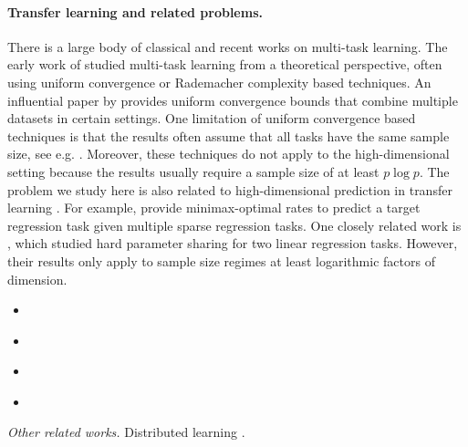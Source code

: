 \paragraph{Transfer learning and related problems.}
There is a large body of classical and recent works on multi-task learning.
The early work of \cite{B00,BS03,M06} studied multi-task learning from a theoretical perspective, often using uniform convergence or Rademacher complexity based techniques.
An influential paper by \cite{BBCK10} provides uniform convergence bounds that combine multiple datasets in certain settings.
One limitation of uniform convergence based techniques is that the results often assume that all  tasks have the same sample size, see e.g. \cite{B00,MPR16}.
\citet{pontil2013excess}
Moreover, these techniques do not apply to the high-dimensional setting because the results usually require a sample size of at least $p \log p$.
The problem we study here is also related to high-dimensional prediction in transfer learning \cite{li2020transfer,bastani2020predicting}.
For example, \cite{li2020transfer} provide minimax-optimal rates to predict a target regression task given multiple sparse regression tasks.
One closely related work is \cite{WZR20}, which studied hard parameter sharing for two linear regression tasks.
However, their results only apply to sample size regimes at least logarithmic factors of dimension.
\begin{itemize}
	\item \citet{lei2021nearoptimal}
	\item \citet{kalan2020minimax}
	\item  \citet{cai2021transfer}
	\item \citet{lounici2011oracle}
\end{itemize}
\textit{Other related works.} Distributed learning \cite{dobriban2018high}.




